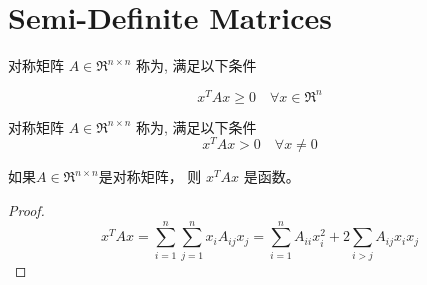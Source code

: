 \section{Semi-Definite Matrices}

\begin{definition}[半正定矩阵]
    对称矩阵 $ A \in \mathfrak{R}^{n \times n} $ 称为, 满足以下条件

\begin{equation}
x^{T} A x \geq 0 \quad \forall x \in \mathfrak{R}^{n}
\end{equation}
\end{definition}

\begin{definition}[正定矩阵]
    对称矩阵 $ A \in \mathfrak{R}^{n \times n} $ 称为, 满足以下条件
\begin{equation}
x^{T} A x>0 \quad \forall x \neq 0
\end{equation}
\end{definition}

\begin{definition}[二次型]
    如果$ A \in \mathfrak{R}^{n \times n} $是对称矩阵， 则 $ x^{T} A x $ 是函数。
\end{definition}

\begin{proof}
    \begin{equation} x^{T} A x=\sum_{i=1}^{n} \sum_{j=1}^{n} x_{i} A_{i j} x_{j}=\sum_{i=1}^{n} A_{i i} x_{i}^{2}+2 \sum_{i>j} A_{i j} x_{i} x_{j} \end{equation}
\end{proof}

